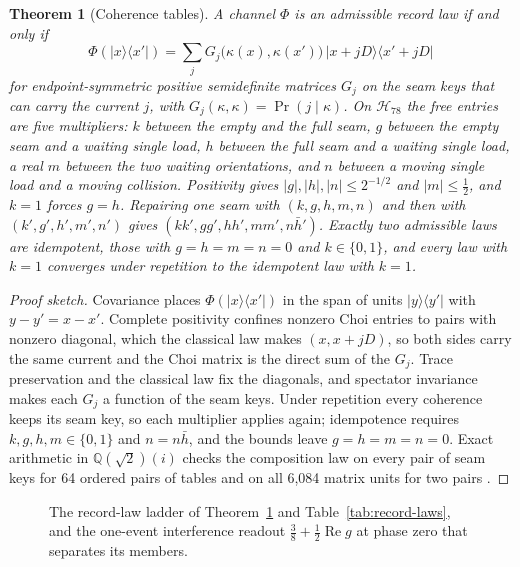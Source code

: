 \documentclass[11pt]{article}
\newtheorem{theorem}{Theorem}[section]
\theoremstyle{definition}
\theoremstyle{remark}
\theoremstyle{plain}
\newcommand{\ket}[1]{\lvert #1\rangle}
\newcommand{\bra}[1]{\langle #1\rvert}
\newcommand{\Hil}{\mathcal{H}}
\begin{document}
\begin{theorem}[Coherence tables]
\label{thm:record-laws}
A channel $\Phi$ is an admissible record law if and only if
\[
\Phi(\ket x\bra{x'})=\sum_j G_j\bigl(\kappa(x),\kappa(x')\bigr)\,
\ket{x+jD}\bra{x'+jD}
\]
for endpoint-symmetric positive semidefinite matrices $G_j$ on the seam keys
that can carry the current $j$, with $G_j(\kappa,\kappa)=\Pr(j\mid\kappa)$.
On $\Hil_{78}$ the free entries are five multipliers: $k$ between the empty
and the full seam, $g$ between the empty seam and a waiting single load, $h$
between the full seam and a waiting single load, a real $m$ between the two
waiting orientations, and $n$ between a moving single load and a moving
collision. Positivity gives $\lvert g\rvert,\lvert h\rvert,\lvert
n\rvert\le2^{-1/2}$ and $\lvert m\rvert\le\frac12$, and $k=1$ forces
$g=h$. Repairing one seam with $(k,g,h,m,n)$ and then with
$(k',g',h',m',n')$ gives $(kk',gg',hh',mm',n\bar h')$. Exactly two admissible
laws are idempotent, those with $g=h=m=n=0$ and $k\in\{0,1\}$, and every law
with $k=1$ converges under repetition to the idempotent law with $k=1$.
\end{theorem}

\begin{proof}[Proof sketch]
Covariance places $\Phi(\ket x\bra{x'})$ in the span of units $\ket
y\bra{y'}$ with $y-y'=x-x'$. Complete positivity confines nonzero Choi
entries to pairs with nonzero diagonal, which the classical law makes
$(x,x+jD)$, so both sides carry the same current and the Choi matrix is the
direct sum of the $G_j$. Trace preservation and the classical law fix the
diagonals, and spectator invariance makes each $G_j$ a function of the seam
keys. Under repetition every coherence keeps its seam key, so each multiplier
applies again; idempotence requires $k,g,h,m\in\{0,1\}$ and $n=n\bar h$, and
the bounds leave $g=h=m=n=0$. Exact arithmetic in $\mathbb Q(\sqrt2)(i)$
checks the composition law on every pair of seam keys for 64 ordered pairs
of tables and on all 6,084 matrix units for two pairs \cite{mRECORDLAWS}.
\end{proof}

\begin{figure}[!htb]
\centering

\caption{The record-law ladder of Theorem~\ref{thm:record-laws} and Table~\ref{tab:record-laws}, and the one-event interference readout $\tfrac38+\tfrac12\operatorname{Re}g$ at phase zero that separates its members.}
\label{fig:record-law-ladder}
\end{figure}
\end{document}
